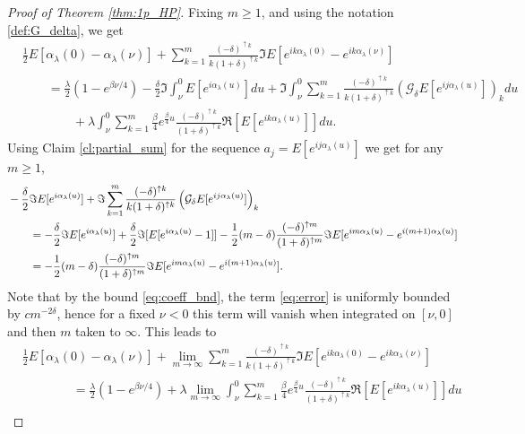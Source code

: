 \documentclass[12pt]{article}
\theoremstyle{definition} %
\theoremstyle{remark} %
\newcommand{\cG}{{\mathcal G}}
\begin{document}
\begin{proof}[Proof of Theorem \ref{thm:1p_HP}]
Fixing $m\ge 1$, and using the notation \eqref{def:G_delta}, we get
\begin{align*}
    &\frac12 E[\alpha_\lambda(0)-\alpha_{\lambda}(\nu)]+\sum_{k=1}^m \frac{(-\delta)^{\uparrow k}}{k (1+\delta)^{\uparrow k}}\Im E[e^{i k \alpha_\lambda(0)}-e^{i k \alpha_{\lambda}(\nu)}]\\
    &\qquad =\frac{\lambda}{2}(1-e^{\beta \nu/4})-\frac{\delta}{2} \Im \int_{\nu}^0 E[e^{i \alpha_\lambda(u)}]du+\Im  \int_{\nu}^0 \sum_{k=1}^m \frac{(-\delta)^{\uparrow k}}{k (1+\delta)^{\uparrow k}} \left(\cG_\delta E[e^{i j \alpha_\lambda(u)}]\right)_k du\\
    &\qquad\qquad
    +\lambda \int_{\nu}^0 \sum_{k=1}^m \frac{\beta}{4}e^{\frac{\beta}{4}u} \frac{(-\delta)^{\uparrow k}}{ (1+\delta)^{\uparrow k}}  \Re[E[e^{i k \alpha_\lambda(u)}]] du.
\end{align*}
Using Claim \ref{cl:partial_sum} for the sequence $a_j=E[e^{i j \alpha_\lambda(u)}]$ we get for any $m\ge 1$,
\begin{align}\notag  &-\frac{\delta}{2} \Im E[e^{i \alpha_\lambda(u)}]+\Im   \sum_{k=1}^m  \frac{(-\delta)^{\uparrow k}}{k (1+\delta)^{\uparrow k}}\left(\cG_\delta E[e^{i j \alpha_\lambda(u)}]\right)_k\\&\notag \qquad  = -\frac{\delta}{2} \Im E[e^{i \alpha_\lambda(u)}]+\frac{\delta}{2}\Im[E[e^{i \alpha_\lambda(u)}-1]]-\frac12 (m-\delta)\frac{(-\delta)^{\uparrow m}}{ (1+\delta)^{\uparrow m}}\Im E[e^{i m \alpha_\lambda(u)}-e^{i (m+1) \alpha_\lambda(u)}]\\
   &\qquad  =-\frac12 (m-\delta)\frac{(-\delta)^{\uparrow m}}{ (1+\delta)^{\uparrow m}}\Im E[e^{i m \alpha_\lambda(u)}-e^{i (m+1) \alpha_\lambda(u)}].\label{eq:error}
\end{align}
Note that by the bound  \eqref{eq:coeff_bnd}, the term \eqref{eq:error} is uniformly bounded by $c m^{-2\delta}$, hence for a fixed $\nu<0$ this term will vanish when integrated on $[\nu,0]$ and then $m$ taken to $\infty$.  This leads to 
\begin{align*}
&   \frac12 E[\alpha_\lambda(0)-\alpha_{\lambda}(\nu)]+\lim_{m\to \infty}\sum_{k=1}^m \frac{(-\delta)^{\uparrow k}}{k (1+\delta)^{\uparrow k}}\Im E[e^{i k \alpha_\lambda(0)}-e^{i k \alpha_{\lambda}(\nu)}]\\
&\qquad\qquad =\frac{\lambda}{2}(1-e^{\beta \nu/4}) +\lambda \lim_{m\to \infty}\int_{\nu}^0 \sum_{k=1}^m \frac{\beta}{4}e^{\frac{\beta}{4}u} \frac{(-\delta)^{\uparrow k}}{ (1+\delta)^{\uparrow k}}  \Re[E[e^{i k \alpha_\lambda(u)}]] du\\

\end{align*}
\end{proof}
\end{document}
